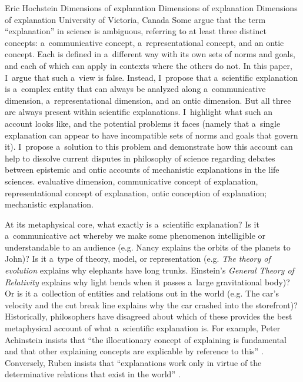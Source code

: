 \begin{artengenv}{Eric Hochstein}
	{Dimensions of explanation}
	{Dimensions of explanation}
	{Dimensions of explanation}
	{University of Victoria, Canada}
	{Some argue that the term ``explanation'' in science is ambiguous, referring to at least three distinct concepts: a~communicative concept, a~representational concept, and an ontic concept. Each is defined in a~different way with its own sets of norms and goals, and each of which can apply in contexts where the others do not. In this paper, I~argue that such a~view is false. Instead, I~propose that a~scientific explanation is a~complex entity that can always be analyzed along a~communicative dimension, a~representational dimension, and an ontic dimension. But all three are always present within scientific explanations. I~highlight what such an account looks like, and the potential problems it faces (namely that a~single explanation can appear to have incompatible sets of norms and goals that govern it). I~propose a~solution to this problem and demonstrate how this account can help to dissolve current disputes in philosophy of science regarding debates between epistemic and ontic accounts of mechanistic explanations in the life sciences.
	}
	{evaluative dimension, communicative concept of explanation, representational concept of explanation, ontic conception of explanation; mechanistic explanation.}




\lettrine[loversize=0.13,lines=2,lraise=-0.03,nindent=0em,findent=0.2pt]%
{A}{}t its metaphysical core, what exactly is a~scientific explanation? Is it a~communicative act whereby we make some phenomenon intelligible or understandable to an audience (e.g. Nancy explains the orbits of the planets to John)? Is it a~type of theory, model, or representation (e.g. \textit{The theory of evolution} explains why elephants have long trunks. Einstein's \textit{General Theory of} \textit{Relativity} explains why light bends when it passes a~large gravitational body)? Or is it a~collection of entities and relations out in the world (e.g. The car's velocity and the cut break line explains why the car crashed into the storefront)? Historically, philosophers have disagreed about which of these provides the best metaphysical account of what a~scientific explanation is. For example, Peter Achinstein insists that ``the illocutionary concept of explaining is fundamental and that other explaining concepts are explicable by reference to this''
\parencite*[][p.22]{achinstein_pragmatic_1984}. %
 Conversely, Ruben insists that ``explanations work only in virtue of the determinative relations that exist in the world'' 
\parencite[][p.231]{ruben_explaining_1990}.%



\end{artengenv}
